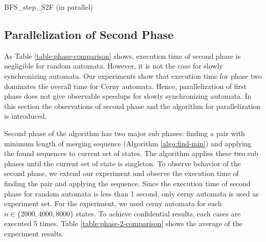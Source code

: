 \documentclass[12pt]{article}
\begin{document}
\begin{algorithm}[ht]
	\label{algo:BFS-step-S2F-Parallel}
	\caption{BFS\_step\_S2F (in parallel)}
	
	
		{
		}
\end{algorithm}


\subsection{Parallelization of Second Phase}
\label{sec:second-phase-parallelization}

As Table \ref{table:phase-comparison} shows, execution time of second phase is negligible for random automata. However, it is not the case for slowly synchronizing automata. Our experiments show that execution time for phase two dominates the overall time for Cerny automata. Hence, parallelization of first phase does not give observable speedups for slowly synchronizing automata. In this section the observations of second phase and the algorithm for parallelization is introduced.

Second phase of the algorithm has two major sub phases: finding a pair with minimum length of merging sequence (Algorithm \ref{algo:find-min}) and applying the found sequences to current set of states. The algorithm applies these two sub phases until the current set of state is singleton. To observe behavior of the second phase, we extend our experiment and observe the execution time of finding the pair and applying the sequence. Since the execution time of second phase for random automata is less than 1 second, only cerny automata is used as experiment set. For the experiment, we used cerny automata for each $n \in \{2000, 4000, 8000\}$ states. To achieve confidential results, each cases are executed 5 times. Table \ref{table:phase-2-comparison} shows the average of the experiment results.
\end{document}
